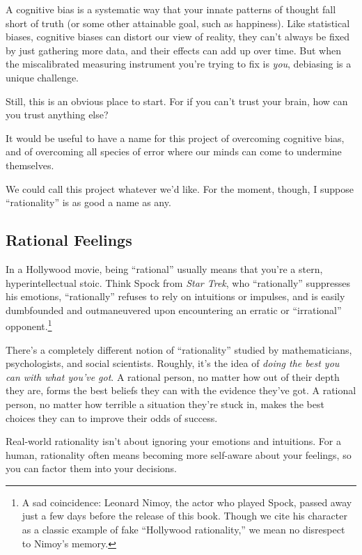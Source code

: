 \documentclass[letterpaper]{book}
\newcommand{\comment}[1]{
}
\begin{document}
{
 A cognitive bias is a systematic way that your innate patterns of
thought fall short of truth (or some other attainable goal, such as
happiness). Like statistical biases, cognitive biases can distort our
view of reality, they can't always be fixed by just
gathering more data, and their effects can add up over time. But when
the miscalibrated measuring instrument you're trying to
fix is \textit{you}, debiasing is a unique challenge.}

{
 Still, this is an obvious place to start. For if you
can't trust your brain, how can you trust anything
else?}

{
 It would be useful to have a name for this project of overcoming
cognitive bias, and of overcoming all species of error where our minds
can come to undermine themselves.}

{
 We could call this project whatever we'd like. For
the moment, though, I suppose
``rationality'' is as good a name as
any.}


\subsection{Rational Feelings}

{
 In a Hollywood movie, being
``rational'' usually means that
you're a stern, hyperintellectual stoic. Think Spock
from \textit{Star Trek}, who
``rationally'' suppresses his
emotions, ``rationally'' refuses to
rely on intuitions or impulses, and is easily dumbfounded and
outmaneuvered upon encountering an erratic or
``irrational''
opponent.\footnote{A sad coincidence: Leonard Nimoy, the actor who played Spock,
passed away just a few days before the release of this book. Though we
cite his character as a classic example of fake
``Hollywood rationality,'' we mean
no disrespect to Nimoy's memory.\comment{2}}}

{
 There's a completely different notion of
``rationality'' studied by
mathematicians, psychologists, and social scientists. Roughly,
it's the idea of \textit{doing the best you can with
what you've got}. A rational person, no matter how out
of their depth they are, forms the best beliefs they can with the
evidence they've got. A rational person, no matter how
terrible a situation they're stuck in, makes the best
choices they can to improve their odds of success.}

{
 Real-world rationality isn't about ignoring your
emotions and intuitions. For a human, rationality often means becoming
more self-aware about your feelings, so you can factor them into your
decisions.}
\end{document}
